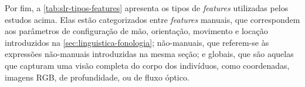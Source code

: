 
Por fim, a \autoref{tab:slr-tipos-features} apresenta os tipos de \textit{features} utilizadas pelos estudos acima. Elas estão categorizados entre \textit{features} manuais, que correspondem aos parâmetros de configuração de mão, orientação, movimento e locação introduzidos na \autoref{sec:linguistica-fonologia}; não-manuais, que referem-se às expressões não-manuais introduzidas na mesma seção; e globais, que são aquelas que capturam uma visão completa do corpo dos indivíduos, como coordenadas, imagens RGB, de profundidade, ou de fluxo óptico.






